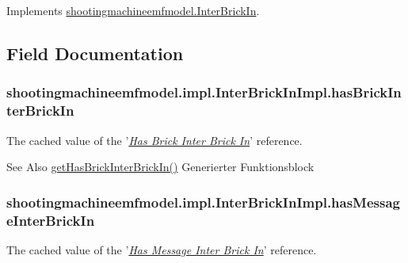 Implements \hyperlink{interfaceshootingmachineemfmodel_1_1_inter_brick_in_a6f334b3021e5eeef585e8e23f9d4b3ca}{shootingmachineemfmodel.\-Inter\-Brick\-In}.



\subsection{Field Documentation}
\hypertarget{classshootingmachineemfmodel_1_1impl_1_1_inter_brick_in_impl_ae99e687b1771e1b30f4f67fb5c56a6d2}{
\subsubsection[{has\-Brick\-Inter\-Brick\-In}]{ shootingmachineemfmodel.\-impl.\-Inter\-Brick\-In\-Impl.\-has\-Brick\-Inter\-Brick\-In\hspace{0.3cm}{\ttfamily [protected]}}}\label{classshootingmachineemfmodel_1_1impl_1_1_inter_brick_in_impl_ae99e687b1771e1b30f4f67fb5c56a6d2}
The cached value of the '\hyperlink{classshootingmachineemfmodel_1_1impl_1_1_inter_brick_in_impl_a25afb33543b6066eb2bfb46b037c4eb5}{{\itshape Has Brick Inter Brick In}}' reference.

\begin{DoxySeeAlso}{See Also}
\hyperlink{classshootingmachineemfmodel_1_1impl_1_1_inter_brick_in_impl_a25afb33543b6066eb2bfb46b037c4eb5}{get\-Has\-Brick\-Inter\-Brick\-In()} Generierter Funktionsblock  
\end{DoxySeeAlso}
\hypertarget{classshootingmachineemfmodel_1_1impl_1_1_inter_brick_in_impl_a49940eb99267dfad1b7e79efbec93e4d}{
\subsubsection[{has\-Message\-Inter\-Brick\-In}]{ shootingmachineemfmodel.\-impl.\-Inter\-Brick\-In\-Impl.\-has\-Message\-Inter\-Brick\-In\hspace{0.3cm}{\ttfamily [protected]}}}\label{classshootingmachineemfmodel_1_1impl_1_1_inter_brick_in_impl_a49940eb99267dfad1b7e79efbec93e4d}
The cached value of the '\hyperlink{classshootingmachineemfmodel_1_1impl_1_1_inter_brick_in_impl_aa379228bebb5f021ecb19114f8637e3b}{{\itshape Has Message Inter Brick In}}' reference.

